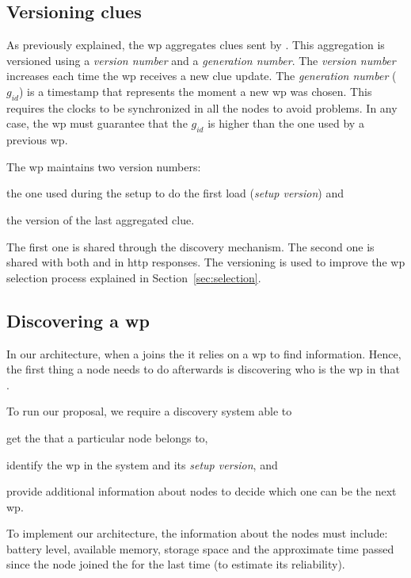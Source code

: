 \subsection{Versioning clues}
As previously explained, the \ac{wp} aggregates clues sent by \providers{}.
This aggregation is versioned using a \emph{version number} and a \emph{generation number}.
The \emph{version number} increases each time the \ac{wp} receives a new clue update.
The \emph{generation number} ($g_{id}$) is a timestamp that represents the moment a new \ac{wp} was chosen.
This requires the clocks to be synchronized in all the nodes to avoid problems.
In any case, the \ac{wp} must guarantee that the $g_{id}$ is higher than the one used by a previous \ac{wp}.

The \ac{wp} maintains two version numbers:
\begin{enumerate*}[label=\itshape(\arabic*\upshape)]
  \item the one used during the setup to do the first load (\emph{setup version}) and
  \item the version of the last aggregated clue.
\end{enumerate*}
The first one is shared through the discovery mechanism.
The second one is shared with both \providers{} and \consumers{} in \acs{http} responses.
The versioning is used to improve the \ac{wp} selection process explained in Section~\ref{sec:selection}.


\subsection{Discovering a \acl{wp}}
In our architecture, when a \consumer{} joins the \Space{} it relies on a \ac{wp} to find information.
Hence, the first thing a node needs to do afterwards is discovering who is the \ac{wp} in that \Space{}.

To run our proposal, we require a discovery system able to
\begin{enumerate*}[label=\itshape(\arabic*\upshape)]
  \item get the \Spaces{} that a particular node belongs to,
  \item identify the \ac{wp} in the system and its \emph{setup version}, and
  \item provide additional information about nodes to decide which one can be the next \ac{wp}.
\end{enumerate*}
To implement our architecture, the information about the nodes must include:
battery level, available memory, storage space and the approximate time passed since the node joined the \Space{} for the last time (to estimate its reliability).

